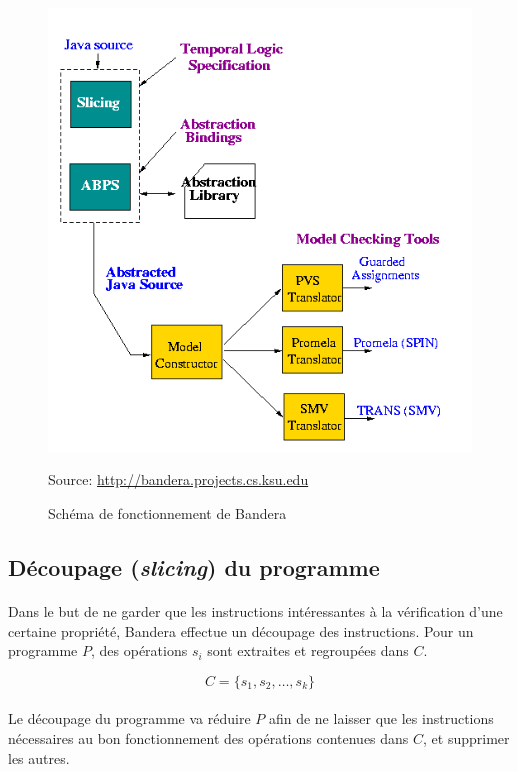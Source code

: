 \begin{figure}[H]
  \centering
  \includegraphics[scale=0.5]{images/bandera_desc.png}
  \caption{\label{fig:desc_bandera_site} Schéma de fonctionnement de Bandera}
   Source: \url{http://bandera.projects.cs.ksu.edu}
\end{figure}


\subsection{Découpage (\textit{slicing}) du programme}
\label{sec:bandera_slicing}

\paragraph{}
Dans le but de ne garder que les instructions intéressantes à la
vérification d'une certaine propriété, Bandera effectue un découpage
des instructions. Pour un programme $P$, des opérations $s_i$ sont
extraites et regroupées dans $C$.

$$C = \{s_1, s_2, \ldots, s_k\}$$

\paragraph{}
Le découpage du programme va réduire $P$ afin de ne laisser que les
instructions nécessaires au bon fonctionnement des opérations
contenues dans $C$, et supprimer les autres.


